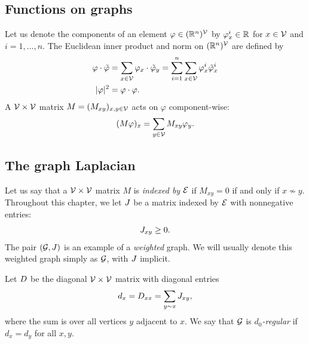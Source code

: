 
\subsection{Functions on graphs}

Let us denote the components of an element $\varphi \in ({\mathbb R}^n)^{\mathcal{V}}$ by
$\varphi^i_x \in {\mathbb R}$ for $x \in \mathcal{V}$ and $i = 1, \ldots, n$.
The Euclidean inner product and norm on $({\mathbb R}^n)^{\mathcal{V}}$
are defined by
\begin{align}
\varphi\cdot\tilde\varphi
	&= \sum_{x\in\mathcal{V}} \varphi_x \cdot \tilde\varphi_y
  		= \sum_{i=1}^n \sum_{x\in\mathcal{V}} \varphi^i_x \tilde\varphi^i_x \\
|\varphi|^2
	&= \varphi \cdot \varphi.
\end{align}
A $\mathcal{V}\times\mathcal{V}$ matrix $M = (M_{xy})_{x,y\in\mathcal{V}}$ acts on $\varphi$
component-wise:
\begin{equation}
(M \varphi)_x = \sum_{y\in\mathcal{V}} M_{xy} \varphi_y.
\end{equation}


\subsection{The graph Laplacian}

Let us say that a $\mathcal{V}\times\mathcal{V}$ matrix $M$ is \emph{indexed by} $\mathcal{E}$
if $M_{xy} = 0$ if and only if $x \not\sim y$.
Throughout this chapter, we let $J$ be a matrix indexed by $\mathcal{E}$ with nonnegative entries:
\begin{equation}
J_{xy} \ge 0.
\end{equation}
The pair $(\mathcal{G}, J)$ is an example of a \emph{weighted} graph.
We will usually denote this weighted graph simply as $\mathcal{G}$, with $J$
implicit.

Let $D$ be the diagonal $\mathcal{V}\times\mathcal{V}$ matrix with diagonal entries
\begin{equation}
d_x = D_{xx} = \sum_{y \sim x} J_{xy},
\end{equation}
where the sum is over all vertices $y$ adjacent to $x$.
We say that $\mathcal{G}$ is \emph{$d_0$-regular} if $d_x = d_y$ for all $x, y$.

